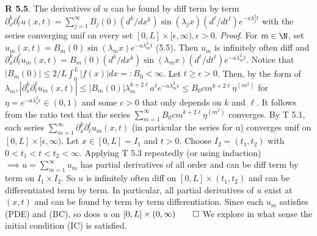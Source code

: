 {\bf R 5.5}. The derivatives of $u$ can be found by diff term by term $\partial_x^k\partial_t^{\ell} u(x,t)=\sum_{j=1}^{\infty}B_j(0)(d^k/dx^k)\sin(\lambda_jx)(d^{\ell}/dt^{\ell})e^{-a\lambda_j^2t}$ with the series converging unif on every set $[0,L]\times [\epsilon, \infty), \epsilon > 0$. {\it Proof}. For $m \in \N$, set $u_m(x,t)=B_m(0)\sin(\lambda_mx)e^{-a \lambda_m^2t}$ (5.5). Then $u_m$ is infinitely often diff and $\partial_x^k\partial_t^{\ell} u_m(x,t)=B_m(0)(d^k/dx^k)\sin(\lambda_mx)(d^{\ell}/dt^{\ell})e^{-a\lambda_m^2t}$. Notice that  $|B_m(0)| \leq 2/L \int_0^L |f(x)|dx =: B_0 < \infty$. Let $t \geq \epsilon >0$. Then, by the form of $\lambda_m, |\partial_x^k\partial_t^{\ell} u_m(x,t)| \leq |B_m(0)| \lambda_m^{k+2 \ell} a^{\ell} e^{-a\lambda_m^2\epsilon} \leq B_0 c m^{k+2\ell}\eta^{(m^2)}$ for $\eta = e^{-a\lambda_1^2\epsilon} \in (0,1)$ and some $c >0$ that only depends on $k$ and $\ell$. It follows from the ratio test that the series $\sum_{m=1}^{\infty}B_0cm^{k+2\ell}\eta^{(m^2)}$ converges.  By T 5.1, each series $\sum_{m=1}^{\infty}\partial_x^k\partial_t^{\ell} u_m(x,t)$ (in particular the series for u) converges unif on $[0,L] \times [\epsilon, \infty)$. Let $x \in [0,L] = I_1$ and $t >0$. Choose $I_2=(t_1,t_2)$ with $0<t_1<t<t_2<\infty$. Applying T 5.3 repeatedly (or using induction) $\implies u = \sum_{m=1}^{\infty}u_m$ has partial derivatives of all order and can be diff term by term on $I_1 \times I_2$. So $u$ is infinitely often diff on $[0,L]\times (t_1,t_2)$ and can be differentiated term by term.  In particular, all partial derivatives of $u$ exist at $(x,t)$ and can be found by term by term differentiation.  Since each $u_m$ satisfies (PDE) and (BC), so does $u$ on $[0,L]\times (0,\infty) \qed$  We explore in what sense the initial condition (IC) is satisfied.
